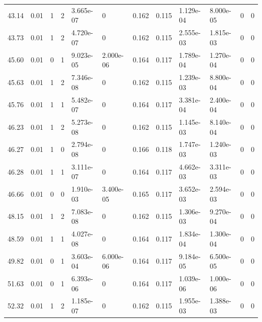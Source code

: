 \documentclass[preview]{standalone}
\begin{document}
{{{\begin{tabular}{L{1.2cm}C{1.2cm} C{0.3cm}C{0.5cm} C{1.4cm}C{1.4cm} C{1.4cm}C{1.4cm} C{1.6cm}C{1.6cm} C{1.6cm}C{1.6cm}}
  43.14  &  0.01  & 1     &  2 &  3.665e-07  & 0  &  0.162&   0.115& 1.129e-04 & 8.000e-05   &  0 & 0  \\ 
  43.73  &  0.01  & 1     &  2 &  4.720e-07  & 0  &  0.162&   0.115& 2.555e-03 & 1.815e-03   &  0 & 0  \\ 
  45.60  &  0.01  & 0     &  1 &  9.023e-05  & 2.000e-06  &  0.164&   0.117& 1.789e-04 & 1.270e-04   &  0 & 0  \\ 
  45.63  &  0.01  & 1     &  2 &  7.346e-08  & 0  &  0.162&   0.115& 1.239e-03 & 8.800e-04   &  0 & 0  \\ 
  45.76  &  0.01  & 1     &  1 &  5.482e-07  & 0  &  0.164&   0.117& 3.381e-04 & 2.400e-04   &  0 & 0  \\ 
  46.23  &  0.01  & 1     &  2 &  5.273e-08  & 0  &  0.162&   0.115& 1.145e-03 & 8.140e-04   &  0 & 0  \\ 
  46.27  &  0.01  & 1     &  0 &  2.794e-08  & 0  &  0.166&   0.118& 1.747e-03 & 1.240e-03   &  0 & 0  \\ 
  46.28  &  0.01  & 1     &  1 &  3.111e-07  & 0  &  0.164&   0.117& 4.662e-03 & 3.311e-03   &  0 & 0  \\ 
  46.66  &  0.01  & 0     &  0 &  1.910e-03  & 3.400e-05  &  0.165&   0.117& 3.652e-03 & 2.594e-03   &  0 & 0  \\ 
  48.15  &  0.01  & 1     &  2 &  7.083e-08  & 0  &  0.162&   0.115& 1.306e-03 & 9.270e-04   &  0 & 0  \\ 
  48.59  &  0.01  & 1     &  1 &  4.027e-08  & 0  &  0.164&   0.117& 1.834e-04 & 1.300e-04   &  0 & 0  \\ 
  49.82  &  0.01  & 0     &  1 &  3.603e-04  & 6.000e-06  &  0.164&   0.117& 9.184e-05 & 6.500e-05   &  0 & 0  \\ 
  51.63  &  0.01  & 0     &  1 &  6.393e-06  & 0  &  0.164&   0.117& 1.039e-06 & 1.000e-06   &  0 & 0  \\ 
  52.32  &  0.01  & 1     &  2 &  1.185e-07  & 0  &  0.162&   0.115& 1.955e-03 & 1.388e-03   &  0 & 0  \\ 
\hline 
\end{tabular} 

}}}
\end{document}

